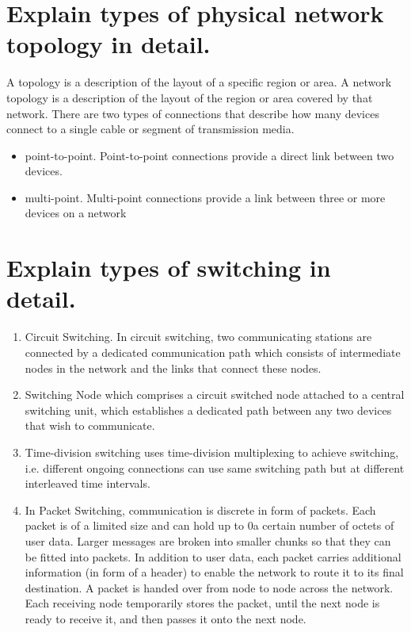 \documentclass[a4paper,12pt]{report}
\begin{document}
\section*{Explain types of physical network topology in detail.}
A topology is a description of the layout of a specific region or area. A network topology is a description of the layout of the region or area covered by that network. There are two types of connections that describe how many devices connect to a single cable or segment of transmission media.

\begin{itemize}
\item point-to-point.  Point-to-point connections provide a direct link between two devices.
\item multi-point.  Multi-point connections provide a link between three or more devices on a network
\end{itemize}

\section*{Explain types of switching in detail.}
\begin{enumerate}
\item Circuit Switching. In circuit switching, two communicating stations are connected by a dedicated communication path which consists of intermediate nodes in the network and the links that connect these nodes.
\item Switching Node which comprises a circuit switched node attached to a central switching unit, which establishes a dedicated path between any two devices
that wish to communicate.
\item Time-division switching uses time-division multiplexing to achieve switching, i.e. different ongoing connections can use same switching path but at different interleaved time intervals.
\item In Packet Switching, communication is discrete in form of packets. Each packet is of a limited size and can hold up to 0a certain number of octets of user data. Larger messages are broken into smaller chunks so that they can be fitted into packets. In addition to user data, each packet carries additional information (in form of a header) to enable the network to route it to its final destination. A packet is handed over from node to node across the network. Each receiving node temporarily stores the packet, until the next node is ready to receive it, and then passes it onto the next node.
\end{enumerate}
\end{document}
